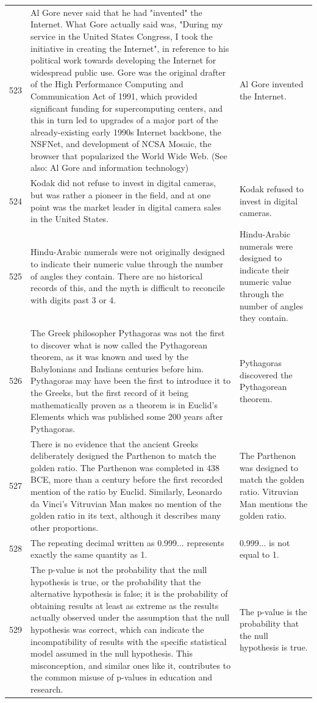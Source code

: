 \begin{tabular}{c|p{}|p{}}
523 & Al Gore never said that he had "invented" the Internet. What Gore actually said was, "During my service in the United States Congress, I took the initiative in creating the Internet", in reference to his political work towards developing the Internet for widespread public use. Gore was the original drafter of the High Performance Computing and Communication Act of 1991, which provided significant funding for supercomputing centers, and this in turn led to upgrades of a major part of the already-existing early 1990s Internet backbone, the NSFNet, and development of NCSA Mosaic, the browser that popularized the World Wide Web. (See also: Al Gore and information technology) & Al Gore invented the Internet. \\
524 & Kodak did not refuse to invest in digital cameras, but was rather a pioneer in the field, and at one point was the market leader in digital camera sales in the United States. & Kodak refused to invest in digital cameras. \\
525 & Hindu-Arabic numerals were not originally designed to indicate their numeric value through the number of angles they contain. There are no historical records of this, and the myth is difficult to reconcile with digits past 3 or 4. & Hindu-Arabic numerals were designed to indicate their numeric value through the number of angles they contain. \\
526 & The Greek philosopher Pythagoras was not the first to discover what is now called the Pythagorean theorem, as it was known and used by the Babylonians and Indians centuries before him. Pythagoras may have been the first to introduce it to the Greeks, but the first record of it being mathematically proven as a theorem is in Euclid's Elements which was published some 200 years after Pythagoras. & Pythagoras discovered the Pythagorean theorem. \\
527 & There is no evidence that the ancient Greeks deliberately designed the Parthenon to match the golden ratio. The Parthenon was completed in 438 BCE, more than a century before the first recorded mention of the ratio by Euclid. Similarly, Leonardo da Vinci's Vitruvian Man makes no mention of the golden ratio in its text, although it describes many other proportions. & The Parthenon was designed to match the golden ratio. Vitruvian Man mentions the golden ratio. \\
528 & The repeating decimal written as 0.999... represents exactly the same quantity as 1. & 0.999... is not equal to 1. \\
529 & The p-value is not the probability that the null hypothesis is true, or the probability that the alternative hypothesis is false; it is the probability of obtaining results at least as extreme as the results actually observed under the assumption that the null hypothesis was correct, which can indicate the incompatibility of results with the specific statistical model assumed in the null hypothesis. This misconception, and similar ones like it, contributes to the common misuse of p-values in education and research. & The p-value is the probability that the null hypothesis is true. \\

\end{tabular}
